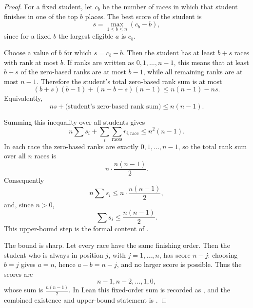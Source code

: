 \begin{proof}
For a fixed student, let \(c_b\) be the number of races in which that student
finishes in one of the top \(b\) places. The best score of the student is
\[
  s=\max_{1\le b\le n}(c_b-b),
\]
since for a fixed \(b\) the largest eligible \(a\) is \(c_b\).

Choose a value of \(b\) for which \(s=c_b-b\). Then the student has at least
\(b+s\) races with rank at most \(b\). If ranks are written as
\(0,1,\ldots,n-1\), this means that at least \(b+s\) of the zero-based ranks
are at most \(b-1\), while all remaining ranks are at most \(n-1\). Therefore
the student's total zero-based rank sum is at most
\[
  (b+s)(b-1)+(n-b-s)(n-1)\le n(n-1)-ns.
\]
Equivalently,
\[
  ns+\text{(student's zero-based rank sum)}\le n(n-1).
\]

Summing this inequality over all students gives
\[
  n\sum s_i+\sum_i\sum_{\text{races}} r_{i,\text{race}}
  \le n^2(n-1).
\]
In each race the zero-based ranks are exactly \(0,1,\ldots,n-1\), so the total
rank sum over all \(n\) races is
\[
  n\cdot\frac{n(n-1)}2.
\]
Consequently
\[
  n\sum s_i\le n\cdot\frac{n(n-1)}2,
\]
and, since \(n>0\),
\[
  \sum s_i\le \frac{n(n-1)}2.
\]
This upper-bound step is the formal content of
.

The bound is sharp. Let every race have the same finishing order. Then the
student who is always in position \(j\), with \(j=1,\ldots,n\), has score
\(n-j\): choosing \(b=j\) gives \(a=n\), hence \(a-b=n-j\), and no larger score
is possible. Thus the scores are
\[
  n-1,n-2,\ldots,1,0,
\]
whose sum is \(\frac{n(n-1)}2\). In Lean this fixed-order sum is recorded as
, and the combined
existence and upper-bound statement is
.
\end{proof}
